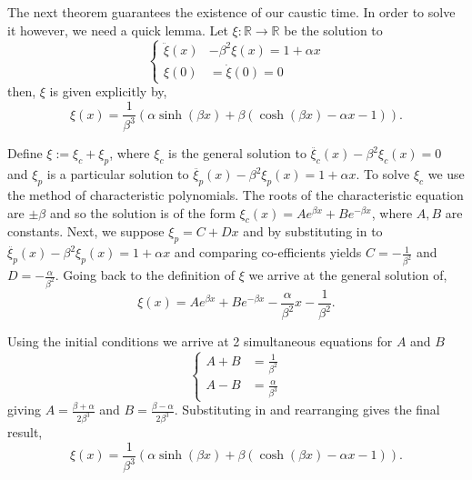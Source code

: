\documentclass[a4paper,12pt,draft]{report}
\theoremstyle{remark}
\theoremstyle{definition}
\begin{document}
The next theorem guarantees the existence of our caustic time.  In order to solve it however, we need a quick lemma.
\lemma
{
Let $\xi :\mathbb{R} \to \mathbb{R}$ be the solution to
$$
\left\{
\begin{aligned}
\ddot{\xi}(x) & - \beta^2\xi(x) = 1 + \alpha x\\
\xi(0) & = \dot{\xi}(0) = 0
\end{aligned}
\right.
$$
then, $\xi$ is given explicitly by,
$$
\xi(x) = \frac{1}{\beta^3}(\alpha\sinh(\beta x) + \beta(\cosh(\beta x) - \alpha x - 1)).
$$
}
\proof
{
Define $\xi := \xi_c + \xi_p$, where $\xi_c$ is the general solution to $\ddot{\xi_c}(x) - \beta^2\xi_c(x) = 0$ and $\xi_p$ is a particular solution to $\ddot{\xi_p}(x) - \beta^2\xi_p(x) = 1 + \alpha x$.  To solve $\xi_c$ we use the method of characteristic polynomials.  The roots of the characteristic equation are $\pm\beta$ and so the solution is of the form $\xi_c(x) = Ae^{\beta x} + Be^{-\beta x}$, where $A, B$ are constants.  Next, we suppose $\xi_p = C + Dx$ and by substituting in to $\ddot{\xi_p}(x) - \beta^2\xi_p(x) = 1 + \alpha x$ and comparing co-efficients yields $C = -\frac{1}{\beta^2}$ and $D = -\frac{\alpha}{\beta^2}$.  Going back to the definition of $\xi$ we arrive at the general solution of,
$$
\xi(x) = Ae^{\beta x} + Be^{-\beta x} - \frac{\alpha}{\beta^2}x - \frac{1}{\beta^2}.
$$

Using the initial conditions we arrive at 2 simultaneous equations for $A$ and $B$
$$
\left\{
\begin{aligned}
A + B & = \frac{1}{\beta^2}\\
A - B & = \frac{\alpha}{\beta^3}
\end{aligned}
\right.
$$
giving $A = \frac{\beta + \alpha}{2\beta^3}$ and $B = \frac{\beta - \alpha}{2\beta^3}$.  Substituting in and rearranging gives the final result,
$$
\xi(x) = \frac{1}{\beta^3}(\alpha\sinh(\beta x) + \beta(\cosh(\beta x) - \alpha x - 1)).
$$

\qedhere
}
\end{document}
